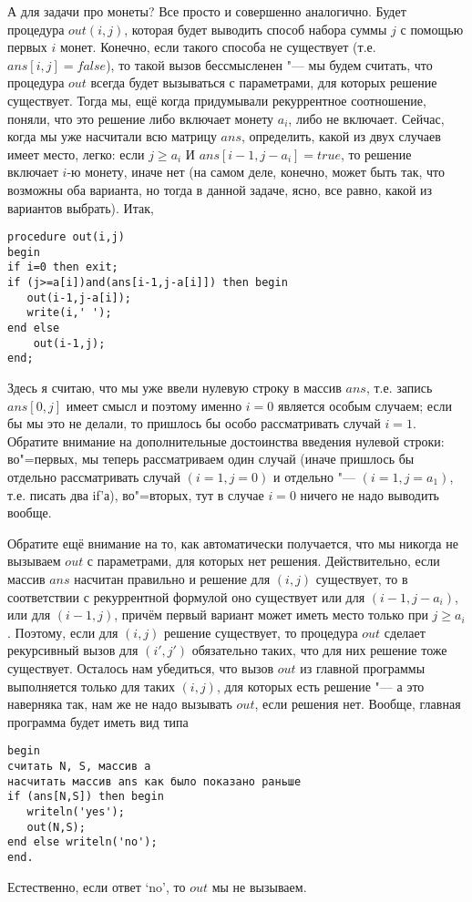 А для задачи про монеты? Все просто и совершенно аналогично. Будет процедура $out(i,j)$, которая будет выводить способ набора суммы $j$ с помощью первых $i$ монет. Конечно, если такого способа не существует (т.е. $ans[i,j]=false$), то такой вызов бессмысленен "--- мы будем считать, что процедура $out$ всегда будет вызываться с параметрами, для которых решение существует. Тогда мы, ещё когда придумывали рекуррентное соотношение, поняли, что это решение либо включает монету $a_i$, либо не включает. Сейчас, когда мы уже насчитали всю матрицу $ans$, определить, какой из двух случаев имеет место, легко: если $j\geq a_i$ И $ans[i-1,j-a_i]=true$, то решение включает $i$-ю монету, иначе нет (на самом деле, конечно, может быть так, что возможны оба варианта, но тогда в данной задаче, ясно, все равно, какой из вариантов выбрать). Итак,
\begin{codesampleo}\begin{verbatim}
procedure out(i,j)
begin
if i=0 then exit;
if (j>=a[i])and(ans[i-1,j-a[i]]) then begin
   out(i-1,j-a[i]);
   write(i,' ');
end else 
    out(i-1,j);
end;
\end{verbatim}\end{codesampleo}
\label{coins_out}
Здесь я считаю, что мы уже ввели нулевую строку в массив $ans$, т.е. запись $ans[0,j]$ имеет смысл и поэтому именно $i=0$ является особым случаем; если бы мы это не делали, то пришлось бы особо рассматривать случай $i=1$. Обратите внимание на дополнительные достоинства введения нулевой строки: во"=первых, мы теперь рассматриваем один случай (иначе пришлось бы отдельно рассматривать случай $(i=1,j=0)$ и отдельно "--- $(i=1,j=a_1)$, т.е. писать два if'а), во"=вторых, тут в случае $i=0$ ничего не надо выводить вообще.

Обратите ещё внимание на то, как автоматически получается, что мы никогда не вызываем $out$ с параметрами, для которых нет решения. Действительно, если массив $ans$ насчитан правильно и решение для $(i,j)$ существует, то в соответствии с рекуррентной формулой оно существует или для $(i-1,j-a_i)$, или для $(i-1,j)$, причём первый вариант может иметь место только при $j\geq a_i$. Поэтому, если для $(i,j)$ решение существует, то процедура $out$ сделает рекурсивный вызов для $(i',j')$ обязательно таких, что для них решение тоже существует. Осталось нам убедиться, что вызов $out$ из главной программы выполняется только для таких $(i,j)$, для которых есть решение "--- а это наверняка так, нам же не надо вызывать $out$, если решения нет. Вообще, главная программа будет иметь вид типа
\begin{codesampleo}\begin{verbatim}
begin
считать N, S, массив a
насчитать массив ans как было показано раньше
if (ans[N,S]) then begin
   writeln('yes');
   out(N,S);
end else writeln('no');
end.
\end{verbatim}\end{codesampleo}
Естественно, если ответ `no', то $out$ мы не вызываем.

